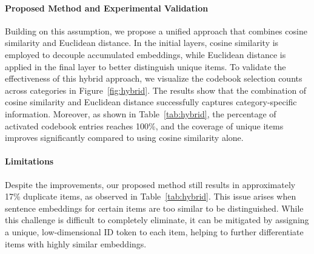 \paragraph{\textbf{Proposed Method and Experimental Validation}} 
Building on this assumption, we propose a unified approach that combines cosine similarity and Euclidean distance. In the initial layers, cosine similarity is employed to decouple accumulated embeddings, while Euclidean distance is applied in the final layer to better distinguish unique items. To validate the effectiveness of this hybrid approach, we visualize the codebook selection counts across categories in Figure~\ref{fig:hybrid}. The results show that the combination of cosine similarity and Euclidean distance successfully captures category-specific information. Moreover, as shown in Table~\ref{tab:hybrid}, the percentage of activated codebook entries reaches 100\%, and the coverage of unique items improves significantly compared to using cosine similarity alone.

\paragraph{\textbf{Limitations}} 
Despite the improvements, our proposed method still results in approximately 17\% duplicate items, as observed in Table~\ref{tab:hybrid}. This issue arises when sentence embeddings for certain items are too similar to be distinguished. While this challenge is difficult to completely eliminate, it can be mitigated by assigning a unique, low-dimensional ID token to each item, helping to further differentiate items with highly similar embeddings.







